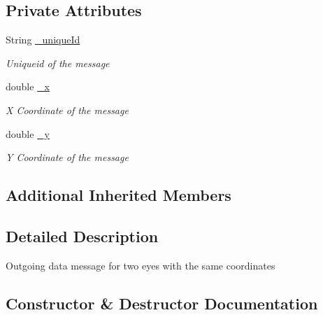 \subsection*{Private Attributes}
\begin{DoxyCompactItemize}
\item 
String \hyperlink{class_web_analyzer_1_1_models_1_1_message_model_1_1_small_data_message_a02f84bd7416e754bb7955a14e5fce9c3}{\+\_\+unique\+Id}
\begin{DoxyCompactList}\small\item\em Uniqueid of the message \end{DoxyCompactList}\item 
double \hyperlink{class_web_analyzer_1_1_models_1_1_message_model_1_1_small_data_message_a88d0991ed95524d8e89f945516e859fe}{\+\_\+x}
\begin{DoxyCompactList}\small\item\em X Coordinate of the message \end{DoxyCompactList}\item 
double \hyperlink{class_web_analyzer_1_1_models_1_1_message_model_1_1_small_data_message_aa0ed275ee89ea7ba8914cd611aae4c0d}{\+\_\+y}
\begin{DoxyCompactList}\small\item\em Y Coordinate of the message \end{DoxyCompactList}\end{DoxyCompactItemize}
\subsection*{Additional Inherited Members}


\subsection{Detailed Description}
Outgoing data message for two eyes with the same coordinates 



\subsection{Constructor \& Destructor Documentation}
\hypertarget{class_web_analyzer_1_1_models_1_1_message_model_1_1_small_data_message_a6d3277a92841d1dad66fc9624440bb44}{}
